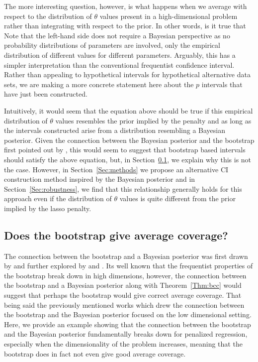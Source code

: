 The more interesting question, however, is what happens when we average with respect to the distribution of $\theta$ values present in a high-dimensional problem rather than integrating with respect to the prior. In other words, is it true that
Note that the left-hand side does not require a Bayesian perspective as no probability distributions of parameters are involved, only the empirical distribution of different values for different parameters. Arguably, this has a simpler interpretation than the conventional frequentist confidence interval. Rather than appealing to hypothetical intervals for hypothetical alternative data sets, we are making a more concrete statement here about the $p$ intervals that have just been constructed.

Intuitively, it would seem that the equation above should be true if this empirical distribution of $\theta$ values resembles the prior implied by the penalty and as long as the intervals constructed arise from a distribution resembling a Bayesian posterior. Given the connection between the Bayesian posterior and the bootstrap first pointed out by \cite{Rubin1981}, this would seem to suggest that bootstrap based intervals should satisfy the above equation, but, in Section~\ref{Sec:boot-bias}, we explain why this is not the case. However, in Section~\ref{Sec:methods} we propose an alternative CI construction method inspired by the Bayesian posterior and in Section~\ref{Sec:robustness}, we find that this relationship generally holds for this approach even if the distribution of $\theta$ values is quite different from the prior implied by the lasso penalty.

\subsection{Does the bootstrap give average coverage?}
\label{Sec:boot-bias}

The connection between the bootstrap and a Bayesian posterior was first drawn by \cite{Rubin1981} and further explored by \cite{efron1982} and \cite{Lo1987}. Its well known that the frequentist properties of the bootstrap break down in high dimensions, however, the connection between the bootstrap and a Bayesian posterior along with Theorem~\ref{Thm:bcc} would suggest that perhaps the bootstrap would give correct average coverage. That being said the previously mentioned works which drew the connection between the bootstrap and the Bayesian posterior focused on the low dimensional setting. Here, we provide an example showing that the connection between the bootstrap and the Bayesian posterior fundamentally breaks down for penalized regression, especially when the dimensionality of the problem increases, meaning that the bootstrap does in fact not even give good average coverage.

